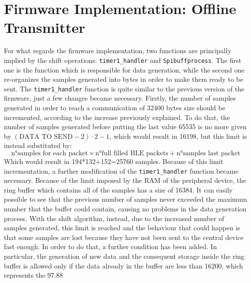 \documentclass{Configuration_Files/PoliMi3i_thesis}
\begin{document}
\section{Firmware Implementation: Offline Transmitter}

For what regards the firmware implementation, two functions are principally implied by the shift operations: \texttt{timer1\_handler} and \texttt{Spibuffprocess}. The first one is the function which is responsible for data generation, while the second one re-organizes the samples generated into bytes in order to make them ready to be sent.
The \texttt{timer1\_handler} function is quite similar to the previous version of the firmware, just a few changes became necessary. Firstly, the number of samples generated in order to reach a communication of 32400 bytes size should be incremented, according to the increase previously explained. To do that, the number of samples generated before putting the last value 65535 is no more given by $(\text{DATA TO SEND}-2) \cdot 2-1$, which would result in 16198, but this limit is instead substituted by:
\[
\text{n°samples for each packet} \times \text{n°full filled BLE packets} + \text{n°samples last packet}
\]
Which would result in 194*132+152=25760 samples. 
Because of this limit incrementation, a further modification of the \texttt{timer1\_handler} function became necessary. Because of the limit imposed by the RAM of the peripheral device, the ring buffer which contains all of the samples has a size of 16384. It can easily possible to see that the previous number of samples never exceeded the maximum number that the buffer could contain, causing no problems in the data generation process. 
With the shift algorithm, instead, due to the increased number of samples generated, this limit is reached and the behaviour that could happen is that some samples are lost because they have not been sent to the central device fast enough. In order to do that, a further condition has been added. In particular, the generation of new data and the consequent storage inside the ring buffer is allowed only if the data already in the buffer are less than 16200, which represents the 97.88%
\end{document}
